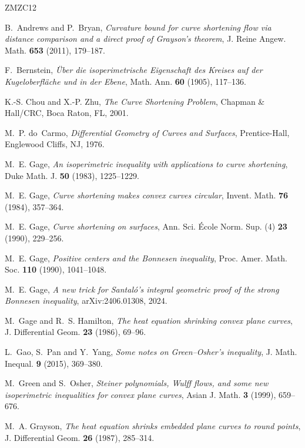 \documentclass[11pt]{amsart}
\theoremstyle{definition}
\theoremstyle{remark}
\numberwithin{equation}{section}
\begin{document}
\begin{thebibliography}{ZMZC12}

B.~Andrews and P.~Bryan, \emph{Curvature bound for curve shortening flow via distance comparison and a direct proof of Grayson's theorem}, J. Reine Angew. Math. \textbf{653} (2011), 179--187.

F.~Bernstein, \emph{\"Uber die isoperimetrische Eigenschaft des Kreises auf der Kugeloberfl\"ache und in der Ebene}, Math. Ann. \textbf{60} (1905), 117--136.

K.-S. Chou and X.-P. Zhu, \emph{The Curve Shortening Problem}, Chapman \& Hall/CRC, Boca Raton, FL, 2001.

M.~P. do~Carmo, \emph{Differential Geometry of Curves and Surfaces}, Prentice-Hall, Englewood Cliffs, NJ, 1976.

M.~E. Gage, \emph{An isoperimetric inequality with applications to curve shortening}, Duke Math. J. \textbf{50} (1983), 1225--1229.

M.~E. Gage, \emph{Curve shortening makes convex curves circular}, Invent. Math. \textbf{76} (1984), 357--364.

M.~E. Gage, \emph{Curve shortening on surfaces}, Ann. Sci. \'Ecole Norm. Sup. (4) \textbf{23} (1990), 229--256.

M.~E. Gage, \emph{Positive centers and the Bonnesen inequality}, Proc. Amer. Math. Soc. \textbf{110} (1990), 1041--1048.

M.~E. Gage, \emph{A new trick for Santal\'o's integral geometric proof of the strong Bonnesen inequality}, arXiv:2406.01308, 2024.

M.~Gage and R.~S. Hamilton, \emph{The heat equation shrinking convex plane curves}, J. Differential Geom. \textbf{23} (1986), 69--96.

L.~Gao, S.~Pan and Y.~Yang, \emph{Some notes on Green--Osher's inequality}, J. Math. Inequal. \textbf{9} (2015), 369--380.

M.~Green and S.~Osher, \emph{Steiner polynomials, Wulff flows, and some new isoperimetric inequalities for convex plane curves}, Asian J. Math. \textbf{3} (1999), 659--676.

M.~A. Grayson, \emph{The heat equation shrinks embedded plane curves to round points}, J. Differential Geom. \textbf{26} (1987), 285--314.


\end{thebibliography}
\end{document}
